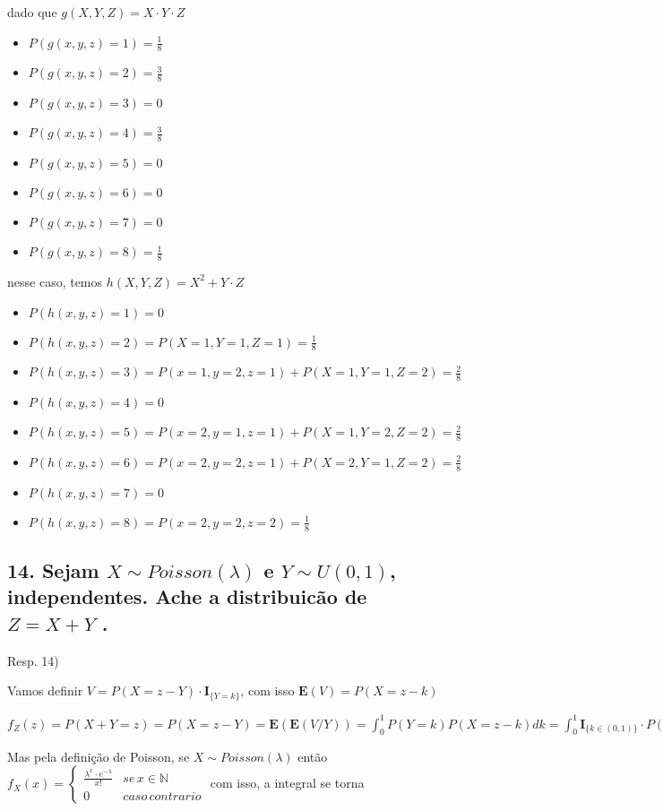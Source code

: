 \documentclass[english]{article}
\begin{document}
dado que $g(X,Y,Z)=X\cdot Y\cdot Z$
\begin{itemize}
\item $P(g(x,y,z)=1)=\frac{1}{8}$
\item $P(g(x,y,z)=2)=\frac{3}{8}$
\item $P(g(x,y,z)=3)=0$
\item $P(g(x,y,z)=4)=\frac{3}{8}$
\item $P(g(x,y,z)=5)=0$
\item $P(g(x,y,z)=6)=0$
\item $P(g(x,y,z)=7)=0$
\item $P(g(x,y,z)=8)=\frac{1}{8}$
\end{itemize}
nesse caso, temos $h(X,Y,Z)=X^{2}+Y\cdot Z$
\begin{itemize}
\item $P(h(x,y,z)=1)=0$
\item $P(h(x,y,z)=2)=P(X=1,Y=1,Z=1)=\frac{1}{8}$
\item $P(h(x,y,z)=3)=P(x=1,y=2,z=1)+P(X=1,Y=1,Z=2)=\frac{2}{8}$
\item $P(h(x,y,z)=4)=0$
\item $P(h(x,y,z)=5)=P(x=2,y=1,z=1)+P(X=1,Y=2,Z=2)=\frac{2}{8}$
\item $P(h(x,y,z)=6)=P(x=2,y=2,z=1)+P(X=2,Y=1,Z=2)=\frac{2}{8}$
\item $P(h(x,y,z)=7)=0$
\item $P(h(x,y,z)=8)=P(x=2,y=2,z=2)=\frac{1}{8}$
\end{itemize}

\subsection*{\textmd{14. Sejam $X\sim Poisson(\lambda)$ e $Y\sim U(0,1)$, independentes.
Ache a distribuicão de $Z=X+Y$ . }}

Resp. 14)

Vamos definir $V=P(X=z-Y)\cdot\mathbf{I}_{\{Y=k\}}$, com isso $\mathbf{E}(V)=P(X=z-k)$

$f_{Z}(z)=P(X+Y=z)=P(X=z-Y)=\mathbf{E}(\mathbf{E}(V/Y))=\int_{0}^{1}P(Y=k)P(X=z-k)dk=\int_{0}^{1}\mathbf{I}_{\{k\in(0,1)\}}\cdot P(X=z-k)dk=\int_{0}^{1}\frac{\lambda^{(z-k)}\cdot e^{-\lambda}}{(z-k)!}dk$

Mas pela definição de Poisson, se $X\sim Poisson(\lambda)$ então
$f_{X}(x)=\begin{cases}
\frac{\lambda^{x}\cdot e^{-\lambda}}{x!} & se\, x\in\mathbb{N}\\
0 & caso\, contrario
\end{cases}$ com isso, a integral se torna
\end{document}
